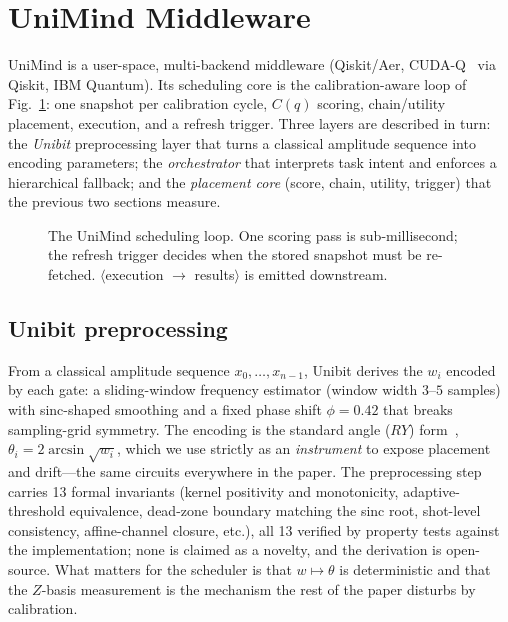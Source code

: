 \documentclass[journal,10pt,twocolumn]{IEEEtran}
\begin{document}
\section{UniMind Middleware}
\label{sec:architecture}
UniMind is a user-space, multi-backend middleware (Qiskit/Aer, CUDA-Q~\cite{cuquantum} via Qiskit, IBM Quantum).
Its scheduling core is the calibration-aware loop of Fig.~\ref{fig:loop}: one snapshot per calibration cycle,
$C(q)$ scoring, chain/utility placement, execution, and a refresh trigger. Three layers are described in turn: the
\emph{Unibit} preprocessing layer that turns a classical amplitude sequence into encoding parameters; the
\emph{orchestrator} that interprets task intent and enforces a hierarchical fallback; and the \emph{placement
core} (score, chain, utility, trigger) that the previous two sections measure.

\begin{figure}[t]
\centering
{}
\caption{The UniMind scheduling loop. One scoring pass is sub-millisecond; the refresh trigger decides when the
stored snapshot must be re-fetched. $\langle$execution $\to$ results$\rangle$ is emitted downstream.}
\label{fig:loop}
\end{figure}

\subsection{Unibit preprocessing}
From a classical amplitude sequence $x_0,\dots,x_{n-1}$, Unibit derives the $w_i$ encoded by each gate: a
sliding-window frequency estimator (window width $3$--$5$ samples) with sinc-shaped smoothing and a fixed
phase shift $\phi{=}0.42$ that breaks sampling-grid symmetry. The encoding is the standard angle
($RY$) form~\cite{schuld2018,hhavlicek2019}, $\theta_i=2\arcsin\sqrt{w_i}$, which we use strictly as an
\emph{instrument} to expose placement and drift---the same circuits everywhere in the paper. The preprocessing
step carries 13 formal invariants (kernel positivity and monotonicity, adaptive-threshold equivalence, dead-zone
boundary matching the sinc root, shot-level consistency, affine-channel closure, etc.), all 13 verified by
property tests against the implementation; none is claimed as a novelty, and the derivation is open-source. What
matters for the scheduler is that $w\mapsto\theta$ is deterministic and that the $Z$-basis measurement is the
mechanism the rest of the paper disturbs by calibration.
\end{document}
